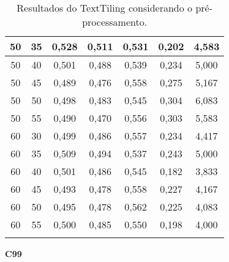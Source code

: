 \documentclass{article}
\begin{document}
\begin{longtable}[c]{|c|c|c|c|c|c|c|}
 50 & 35 & 0,528 & 0,511 & 0,531 & 0,202 & 4,583  \\ \hline 
 50 & 40 & 0,501 & 0,488 & 0,539 & 0,234 & 5,000  \\ \hline 
 50 & 45 & 0,489 & 0,476 & 0,558 & 0,275 & 5,167  \\ \hline 
 50 & 50 & 0,498 & 0,483 & 0,545 & 0,304 & 6,083  \\ \hline 
 50 & 55 & 0,490 & 0,470 & 0,556 & 0,303 & 5,583  \\ \hline 
 60 & 30 & 0,499 & 0,486 & 0,557 & 0,234 & 4,417  \\ \hline 
 60 & 35 & 0,509 & 0,494 & 0,537 & 0,243 & 5,000  \\ \hline 
 60 & 40 & 0,501 & 0,486 & 0,545 & 0,182 & 3,833  \\ \hline 
 60 & 45 & 0,493 & 0,478 & 0,558 & 0,227 & 4,167  \\ \hline 
 60 & 50 & 0,495 & 0,478 & 0,562 & 0,225 & 4,083  \\ \hline 
 60 & 55 & 0,500 & 0,485 & 0,550 & 0,198 & 4,000  \\ \hline 

\caption{Resultados do TextTiling considerando o pré-processamento.}
\end{longtable} 

 \newpage



{  
\large
\center
	\textbf{C99}  

}
\end{document}
